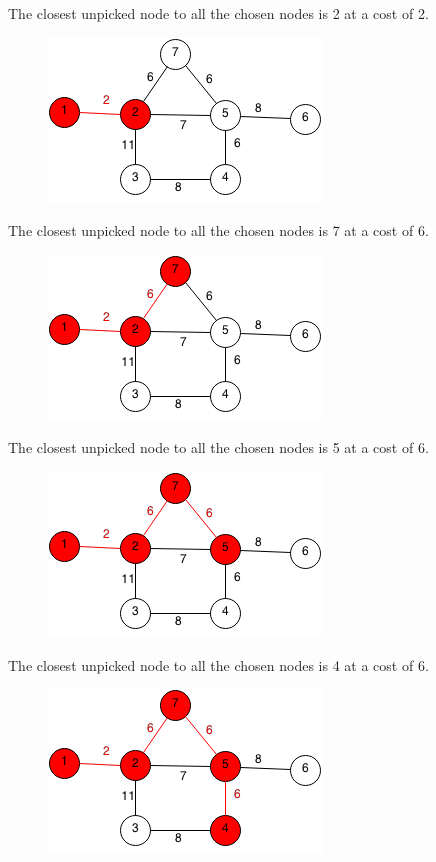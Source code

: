 \documentclass[11pt,oneside]{book}
\makeatletter
\def\maxwidth#1{\ifdim\Gin@nat@width>#1 #1\else\Gin@nat@width\fi}
\makeatother
\begin{document}
The closest unpicked node to all the chosen nodes is 2 at a cost of 2.

\vspace{5px}\begin{figure}[H]\centering
        \includegraphics[width=0.66\maxwidth{\textwidth}]{prim2.png}
        \end{figure}

The closest unpicked node to all the chosen nodes is 7 at a cost of 6.

\vspace{5px}\begin{figure}[H]\centering
        \includegraphics[width=0.66\maxwidth{\textwidth}]{prim3.png}
        \end{figure}

The closest unpicked node to all the chosen nodes is 5 at a cost of 6.

\vspace{5px}\begin{figure}[H]\centering
        \includegraphics[width=0.66\maxwidth{\textwidth}]{prim4.png}
        \end{figure}

The closest unpicked node to all the chosen nodes is 4 at a cost of 6.
\vspace{5px}\begin{figure}[H]\centering
        \includegraphics[width=0.66\maxwidth{\textwidth}]{prim5.png}
        \end{figure}
\end{document}
